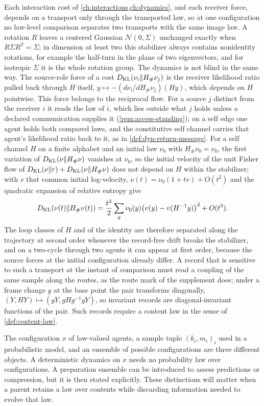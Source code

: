 Each interaction cost of \cref{ch:interactions,ch:dynamics}, and each receiver force, depends on a transport only through the transported law, so at one configuration no law-level comparison separates two transports with the same image law. A rotation $R$ leaves a centered Gaussian $\mathcal N(0,\Sigma)$ unchanged exactly when $R\Sigma R^T=\Sigma$; in dimension at least two this stabilizer always contains nonidentity rotations, for example the half-turn in the plane of two eigenvectors, and for isotropic $\Sigma$ it is the whole rotation group. The dynamics is not blind in the same way. The source-role force of a cost $D_{\mathrm{KL}}(\nu_i\Vert H_\#\nu_j)$ is the receiver likelihood ratio pulled back through $H$ itself, $y\mapsto-(d\nu_i/dH_\#\nu_j)(Hy)$, which depends on $H$ pointwise. This force belongs to the reciprocal flow. For a source $j$ distinct from the receiver $i$ it reads the law of $i$, which lies outside what $j$ holds unless a declared communication supplies it (\cref{rem:access-standing}); on a self edge one agent holds both compared laws, and the constitutive self channel carries that agent's likelihood ratio back to it, as in \cref{def:dyn-return-message}. For a self channel $H$ on a finite alphabet and an initial law $\nu_0$ with $H_\#\nu_0=\nu_0$, the first variation of $D_{\mathrm{KL}}(\nu\Vert H_\#\nu)$ vanishes at $\nu_0$, so the initial velocity of the unit Fisher flow of $D_{\mathrm{KL}}(\nu\Vert r)+D_{\mathrm{KL}}(\nu\Vert H_\#\nu)$ does not depend on $H$ within the stabilizer; with $v$ that common initial log-velocity, $\nu(t)=\nu_0(1+tv)+O(t^2)$ and the quadratic expansion of relative entropy give
\begin{equation}
D_{\mathrm{KL}}(\nu(t)\Vert H_\#\nu(t))=\frac{t^2}{2}\sum_y\nu_0(y)\bigl(v(y)-v(H^{-1}y)\bigr)^2+O(t^3).
\end{equation}
The loop classes of $H$ and of the identity are therefore separated along the trajectory at second order whenever the record-free drift breaks the stabilizer, and on a two-cycle through two agents it can appear at first order, because the source forces at the initial configuration already differ. A record that is sensitive to such a transport at the instant of comparison must read a coupling of the same sample along the routes, as the route mark of the supplement does; under a frame change $g$ at the base point the pair transforms diagonally, $(Y,HY)\mapsto(gY,gHg^{-1}gY)$, so invariant records are diagonal-invariant functions of the pair. Such records require a content law in the sense of \cref{def:content-law}.

The configuration $x$ of law-valued agents, a sample tuple $(k_i,m_i)_i$ used in a probabilistic model, and an ensemble of possible configurations are three different objects. A deterministic dynamics on $x$ needs no probability law over configurations. A preparation ensemble can be introduced to assess predictions or compression, but it is then stated explicitly. These distinctions will matter when a parent retains a law over contents while discarding information needed to evolve that law.
